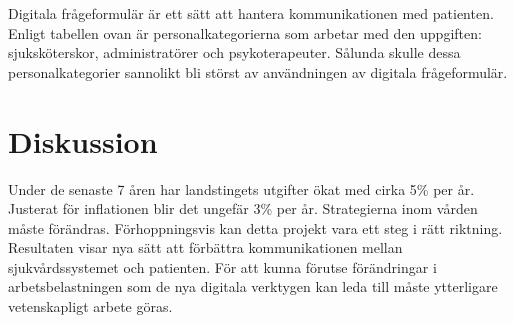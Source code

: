 \documentclass[12pt,a4paper,oneside]{article}
\let\oldcite\cite
\renewcommand*\cite[1]{\textsuperscript{\oldcite{#1}}}
\begin{document}
\newpage
Digitala fr{\aa}geformul{\"a}r {\"a}r ett s{\"a}tt att hantera kommunikationen med patienten. Enligt tabellen ovan {\"a}r personalkategorierna som arbetar med den uppgiften: sjuksk{\"o}terskor, administrat{\"o}rer och psykoterapeuter. S{\aa}lunda skulle dessa personalkategorier sannolikt bli st{\"o}rst av anv{\"a}ndningen av digitala fr{\aa}geformul{\"a}r.


\section*{Diskussion}
Under de senaste 7 {\aa}ren har landstingets utgifter {\"o}kat med cirka 5\% per {\aa}r. Justerat f{\"o}r inflationen blir det ungef{\"a}r 3\% per {\aa}r\cite{numbers3.1, numbers3.2}. Strategierna inom v{\aa}rden m{\aa}ste f{\"o}r{\"a}ndras. F{\"o}rhoppningsvis kan detta projekt vara ett steg i r{\"a}tt riktning. Resultaten visar nya s{\"a}tt att f{\"o}rb{\"a}ttra kommunikationen mellan sjukv{\aa}rdssystemet och patienten.
F{\"o}r att kunna f{\"o}rutse f{\"o}r{\"a}ndringar i arbetsbelastningen som de nya digitala verktygen kan leda till m{\aa}ste ytterligare vetenskapligt arbete g{\"o}ras. %

\end{document}
